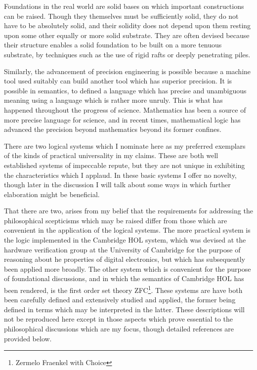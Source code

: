 \documentclass[10pt,titlepage]{book}
\begin{document}
Foundations in the real world are solid bases on which important constructions can be raised.
Though they themselves must be sufficiently solid, they do not have to be absolutely solid, and their solidity does not depend upon them resting upon some other equally or more solid substrate.
They are often devised because their structure enables a solid foundation to be built on a more tenuous substrate, by techniques such as the use of rigid rafts or deeply penetrating piles.

Similarly, the advancement of precision engineering is possible because a machine tool used suitably can build another tool which has superior precision.
It is possible in semantics, to defined a language which has precise and unambiguous meaning using a language which is rather more unruly.
This is what has happened throughout the progress of science.
Mathematics has been a source of more precise language for science, and in recent times, mathematical logic has advanced the precision beyond mathematics beyond its former confines.

There are two logical systems which I nominate here as my preferred exemplars of the kinds of practical universality in my claims.
These are both well established systems of impeccable repute, but they are not unique in exhibiting the characteristics which I applaud.
In these basic systems I offer no novelty, though later in the discussion I will talk about some ways in which further elaboration might be beneficial.

That there are two, arises from my belief that the requirements for addressing the philosophical scepticisms which may be raised differ from those which are convenient in the application of the logical systems.
The more practical system is the logic implemented in the Cambridge HOL system, which was devised at the hardware verification group at the University of Cambridge for the purpose of reasoning about he properties of digital electronics, but which has subsequently been applied more broadly.
The other system which is convenient for the purpose of foundational discussions, and in which the semantics of Cambridge HOL has been rendered, is the first order set theory ZFC\footnote{Zermelo Fraenkel with Choice}.
These systems are have both been carefully defined and extensively studied and applied, the former being defined in terms which may be interpreted in the latter.
These descriptions will not be reproduced here except in those aspects which prove essential to the philosophical discussions which are my focus, though detailed references are provided below.
  
\end{document}
